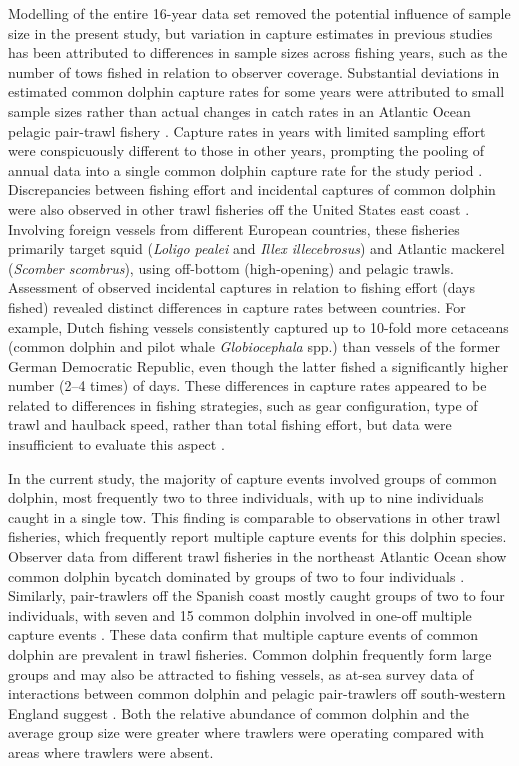\documentclass[10pt]{article}
\begin{document}
Modelling of the entire 16-year data set removed the potential influence of sample size in the present study, but variation in capture estimates in previous studies has been attributed to differences in sample sizes across fishing years, such as the number of tows fished in relation to observer coverage. Substantial deviations in estimated common dolphin capture rates for some years were attributed to small sample sizes rather than actual changes in catch rates in an Atlantic Ocean pelagic pair-trawl fishery \cite{northridge_estimation_1996}.  Capture rates in years with limited sampling effort were conspicuously different to those in other years, prompting the pooling of annual data into a single common dolphin capture rate for the study period \cite{northridge_estimation_1996}.  Discrepancies between fishing effort and incidental captures of common dolphin were also observed in other trawl fisheries off the United States east coast \cite{waring_incidental_1990}.  Involving foreign vessels from different European countries, these fisheries primarily target squid (\emph{Loligo pealei} and \emph{Illex illecebrosus}) and Atlantic mackerel (\emph{Scomber scombrus}), using off-bottom (high-opening) and pelagic trawls.  Assessment of observed incidental captures in relation to fishing effort (days fished) revealed distinct differences in capture rates between countries.  For example, Dutch fishing vessels consistently captured up to 10-fold more cetaceans (common dolphin and pilot whale \emph{Globiocephala} spp.) than vessels of the former German Democratic Republic, even though the latter fished a significantly higher number (2--4 times) of days.  These differences in capture rates appeared to be related to differences in fishing strategies, such as gear configuration, type of trawl and haulback speed, rather than total fishing effort, but data were insufficient to evaluate this aspect \cite{waring_incidental_1990}.  

In the current study, the majority of capture events involved groups of common dolphin, most frequently two to three individuals, with up to nine individuals caught in a single tow. This finding is comparable to observations in other trawl fisheries, which frequently report multiple capture events for this dolphin species.  Observer data from different trawl fisheries in the northeast Atlantic Ocean show common dolphin bycatch dominated by groups of two to four individuals \cite{morizur_incidental_1999}. Similarly, pair-trawlers off the Spanish coast mostly caught groups of two to four individuals, with seven and 15 common dolphin involved in one-off multiple capture events  \cite{fernandez_incidental_2010}.  These data confirm that multiple capture events of common dolphin are prevalent in trawl fisheries.  Common dolphin frequently form large groups and may also be attracted to fishing vessels, as at-sea survey data of interactions between common dolphin and pelagic pair-trawlers off south-western England suggest \cite{boer_interactions_2012}. Both the relative abundance of common dolphin and the average group size were greater where trawlers were operating compared with areas where trawlers were absent.
\end{document}
